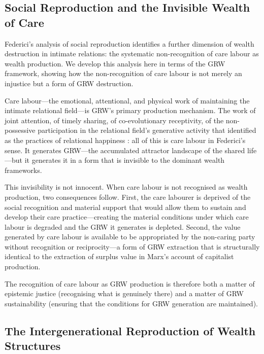 \subsection{Social Reproduction and the Invisible Wealth of Care}
\label{p15:subsec:socialreproduction}

\noindent
Federici's analysis of social reproduction \parencite{federici2004} identifies a further dimension of wealth destruction in intimate relations: the systematic non-recognition of care labour as wealth production. We develop this analysis here in terms of the GRW framework, showing how the non-recognition of care labour is not merely an injustice but a form of GRW destruction.

Care labour---the emotional, attentional, and physical work of maintaining the intimate relational field---is GRW's primary production mechanism. The work of joint attention, of timely sharing, of co-evolutionary receptivity, of the non-possessive participation in the relational field's generative activity that  identified as the practices of relational happiness \parencite{paperxiv}: all of this is care labour in Federici's sense. It generates GRW---the accumulated attractor landscape of the shared life---but it generates it in a form that is invisible to the dominant wealth frameworks.

This invisibility is not innocent. When care labour is not recognised as wealth production, two consequences follow. First, the care labourer is deprived of the social recognition and material support that would allow them to sustain and develop their care practice---creating the material conditions under which care labour is degraded and the GRW it generates is depleted. Second, the value generated by care labour is available to be appropriated by the non-caring party without recognition or reciprocity---a form of GRW extraction that is structurally identical to the extraction of surplus value in Marx's account of capitalist production.

The recognition of care labour as GRW production is therefore both a matter of epistemic justice (recognising what is genuinely there) and a matter of GRW sustainability (ensuring that the conditions for GRW generation are maintained).

\subsection{The Intergenerational Reproduction of Wealth Structures}
\label{p15:subsec:intergenerational}

